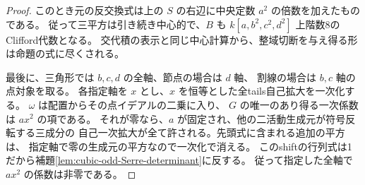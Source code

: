 \begin{proof}
このとき元の反交換式は上の $S$ の右辺に中央定数 $a^2$ の倍数を加えたものである。
従って三平方は引き続き中心的で、$B$ も $k[a,b^2,c^2,d^2]$ 上階数8のClifford代数となる。
交代積の表示と同じ中心計算から、整域切断を与え得る形は命題の式に尽くされる。

最後に、三角形では $b,c,d$ の全軸、節点の場合は $d$ 軸、
割線の場合は $b,c$ 軸の点対象を取る。
各指定軸を $x$ とし、$x$ を恒等とした全tails自己拡大を一次化する。
$\omega$ は配置からその点イデアルの二乗に入り、
$G$ の唯一のあり得る一次係数は $a x^2$ の項である。
それが零なら、$a$ が固定され、他の二活動生成元が符号反転する三成分の
自己一次拡大が全て許される。先頭式に含まれる追加の平方は、
指定軸で零の生成元の平方なので一次化で消える。
このshiftの行列式は1だから補題\ref{lem:cubic-odd-Serre-determinant}に反する。
従って指定した全軸で $a x^2$ の係数は非零である。
\end{proof}

